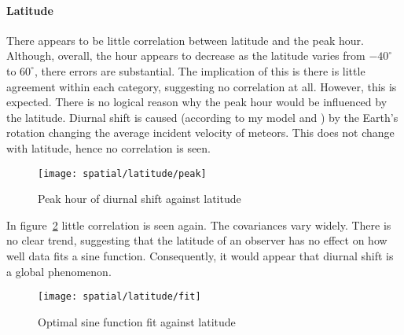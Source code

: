 \paragraph{Latitude\\}
There appears to be little correlation between latitude and the peak hour. Although, overall, the hour appears to decrease as the latitude varies from $-40^{\circ}$ to $60^{\circ}$, there errors are substantial. The implication of this is there is little agreement within each category, suggesting no correlation at all. However, this is expected. There is no logical reason why the peak hour would be influenced by the latitude. Diurnal shift is caused (according to my model and \cite{baa}) by the Earth's rotation changing the average incident velocity of meteors. This does not change with latitude, hence no correlation is seen.
\begin{figure}[h!]
	\centering
	\texttt{[image: spatial/latitude/peak]}
	\caption{Peak hour of diurnal shift against latitude
		\label{fig:dishift:lat:peak}}
\end{figure}

In figure~\ref{fig:dishift:lat:fit} little correlation is seen again. The covariances vary widely. There is no clear trend, suggesting that the latitude of an observer has no effect on how well data fits a sine function. Consequently, it would appear that diurnal shift is a global phenomenon.
\begin{figure}[h!]
	\centering
	\texttt{[image: spatial/latitude/fit]}
	\caption{Optimal sine function fit against latitude
		\label{fig:dishift:lat:fit}}
\end{figure}


